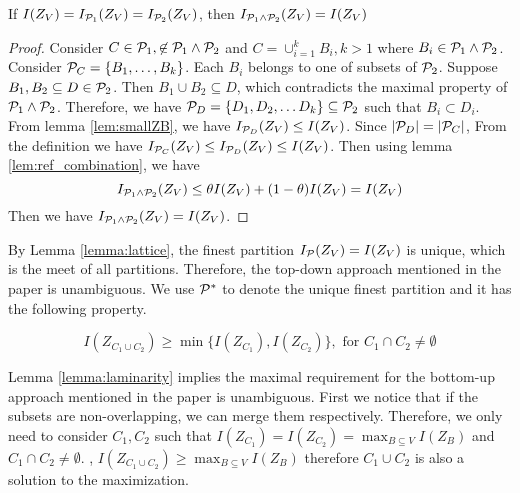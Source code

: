 \documentclass{article}
\begin{document}
\begin{lemma}\label{lemma:lattice}
If $I(Z_V) = I_{\P_1}(Z_V) = I_{\P_2}(Z_V)$, then $I_{\P_1 \wedge \P_2}(Z_V)=I(Z_V) $
\end{lemma}
\begin{proof}
Consider $C\in \P_1, \not\in \P_1\wedge\P_2$ and $C = \cup_{i=1}^k B_i, k>1$ where $B_i \in \P_1 \wedge \P_2$.
Consider $\P_C = \{B_1, \dots, B_k\}$. Each $B_i$ belongs to one of subsets of $\P_2$. Suppose $B_1, B_2 \subseteq D \in \P_2$. Then $B_1\cup B_2 \subseteq D$,
which contradicts the maximal property of $\P_1\wedge \P_2$. Therefore, we have $\P_D = \{D_1, D_2, \dots D_k\}\subseteq \P_2$ such that $B_i \subset D_i$.
From lemma \ref{lem:smallZB}, we have $I_{\P_D}(Z_V) \leq I(Z_V)$. Since $\abs{\P_D} = \abs{\P_C}$, From the definition we have $I_{\P_C}(Z_V) \leq I_{\P_D}(Z_V) \leq I(Z_V)$.
Then using lemma \ref{lem:ref_combination}, we have
\begin{equation*}
I_{\P_1 \wedge \P_2}(Z_V) \leq \theta I(Z_V) + (1- \theta)I(Z_V) = I(Z_V)
\end{equation*} 
Then we have $I_{\P_1 \wedge \P_2}(Z_V)=I(Z_V)$.
\end{proof}

By Lemma \ref{lemma:lattice}, the finest partition $I_{\P}(Z_V)=I(Z_V)$ is unique, which is the meet of all partitions. Therefore, the top-down approach mentioned in the paper is unambiguous. We use $\P^*$ to denote the unique finest partition and it has the following property.

\begin{lemma}\label{lemma:laminarity}
\begin{equation}\label{eq:P}
I(Z_{C_1 \cup C_2}) \geq \min\{ I(Z_{C_1}), I(Z_{C_2})\}, \textrm{ for } C_1\cap C_2 \neq \emptyset
\end{equation}
\end{lemma}

Lemma \ref{lemma:laminarity} implies the maximal requirement for the bottom-up approach mentioned in the paper is unambiguous. First we notice that if the subsets are non-overlapping, we can merge them respectively. Therefore, we only need to consider $C_1, C_2$ such that $I(Z_{C_1}) = I(Z_{C_2}) = \max_{B\subseteq V} I(Z_B)$ and $C_1\cap C_2 \neq \emptyset$. , $I(Z_{C_1\cup C_2}) \geq \max_{B\subseteq V} I(Z_B)$ therefore $C_1\cup C_2$ is also a solution to the maximization.
\end{document}
